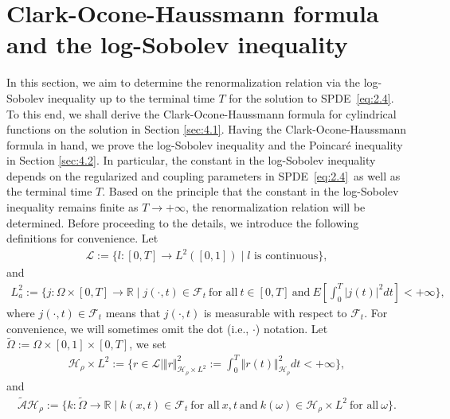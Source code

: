 \documentclass[11pt]{article}
\numberwithin{equation}{section}%
\numberwithin{figure}{section}%
\theoremstyle{remark}
\begin{document}
	\section{Clark-Ocone-Haussmann formula and the log-Sobolev inequality}\label{sec:4}
	In this section, we aim to determine the renormalization relation via the log-Sobolev inequality up to the terminal time $T$ for the solution to SPDE~\eqref{eq:2.4}. To this end, we shall derive the Clark-Ocone-Haussmann formula for cylindrical functions on the solution in Section \ref{sec:4.1}. Having the Clark-Ocone-Haussmann formula in hand, we prove the log-Sobolev inequality and the Poincar\'e inequality 
	in Section \ref{sec:4.2}. In particular, the constant in the log-Sobolev inequality depends on the regularized and coupling parameters in SPDE~\eqref{eq:2.4}~as well as the terminal time $T$.  Based on the principle that the constant in the log-Sobolev inequality remains finite as $T\rightarrow+\infty$, the renormalization relation will be determined. Before proceeding to the details, we introduce the following definitions for convenience. Let
	\begin{align*} \mathcal{L}:=\{l:[0,T]\rightarrow L^{2}([0,1])\mid l\text{ is continuous}\},
	\end{align*}
	and
	\begin{align}\label{eq:space}
		L_{a}^{2}:=\{j:\Omega\times[0,T]\rightarrow\mathbb{R}\mid j(\cdot,t)\in\mathcal{F}_{t}\ \text{for all}\ t\in[0,T]\ \text{and} \ E[\int_{0}^{T}|j(t)|^{2}dt]<+\infty\},
	\end{align}
		where $j(\cdot,t)\in\mathcal{F}_{t}$ means that $j(\cdot,t)$ is measurable with respect to $\mathcal{F}_{t}$. For convenience, we will sometimes omit the dot (i.e., 
	$\cdot$) notation.
	 Let $\tilde{\Omega}:=\Omega\times[0,1]\times[0,T]$, we set
	 \begin{align*}
	 	\mathcal{H}_{\rho}\times L^{2}:=\{r\in\mathcal{L}\mid \Vert r\Vert^{2}_{\mathcal{H}_{\rho}\times L^{2}}:= \int_{0}^{T}\Vert r(t)\Vert^{2}_{\mathcal{H}_{\rho}}dt<+\infty\},
	 \end{align*}
	 and
	\begin{align*}
		\tilde{\mathcal{A}}\mathcal{H}_{\rho}:=\{k:\tilde{\Omega}\rightarrow\mathbb{R}\mid k(x,t)\in \mathcal{F}_{t}\ \text{for all} \ x,t\ \text{and}\ k(\omega) \in \mathcal{H}_{\rho}\times L^{2}\ \text{for all} \ \omega\}.
	\end{align*}
\end{document}
